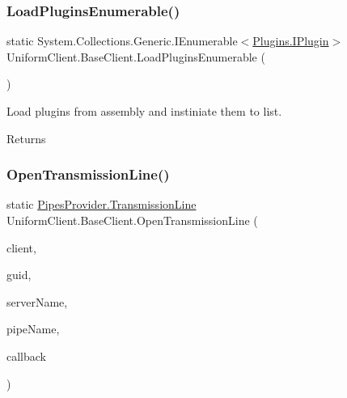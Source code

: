 \subsubsection{\texorpdfstring{Load\+Plugins\+Enumerable()}{LoadPluginsEnumerable()}}
{\footnotesize\ttfamily static System.\+Collections.\+Generic.\+I\+Enumerable$<$\mbox{\hyperlink{interface_uniform_client_1_1_plugins_1_1_i_plugin}{Plugins.\+I\+Plugin}}$>$ Uniform\+Client.\+Base\+Client.\+Load\+Plugins\+Enumerable (\begin{DoxyParamCaption}{ }\end{DoxyParamCaption})\hspace{0.3cm}{\ttfamily [static]}}



Load plugins from assembly and instiniate them to list. 

\begin{DoxyReturn}{Returns}

\end{DoxyReturn}
\mbox{\label{class_uniform_client_1_1_base_client_a9c59b23626ff132aa96630654d7bc410}} 
\subsubsection{\texorpdfstring{Open\+Transmission\+Line()}{OpenTransmissionLine()}}
{\footnotesize\ttfamily static \mbox{\hyperlink{class_pipes_provider_1_1_transmission_line}{Pipes\+Provider.\+Transmission\+Line}} Uniform\+Client.\+Base\+Client.\+Open\+Transmission\+Line (\begin{DoxyParamCaption}\item[{\mbox{\hyperlink{class_uniform_client_1_1_base_client}{Base\+Client}}}]{client,  }\item[{string}]{guid,  }\item[{string}]{server\+Name,  }\item[{string}]{pipe\+Name,  }\item[{System.\+Action$<$ \mbox{\hyperlink{class_pipes_provider_1_1_transmission_line}{Pipes\+Provider.\+Transmission\+Line}} $>$}]{callback }\end{DoxyParamCaption})\hspace{0.3cm}{\ttfamily [static]}}




